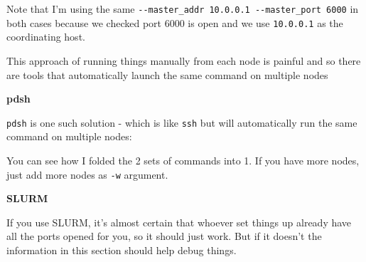 \documentclass[
]{report}
\newenvironment{Shaded}{\begin{snugshade}}{\end{snugshade}}
\newcommand{\AttributeTok}[1]{\textcolor[rgb]{0.40,0.45,0.13}{#1}}
\newcommand{\DataTypeTok}[1]{\textcolor[rgb]{0.68,0.00,0.00}{#1}}
\newcommand{\ExtensionTok}[1]{\textcolor[rgb]{0.00,0.23,0.31}{#1}}
\newcommand{\FunctionTok}[1]{\textcolor[rgb]{0.28,0.35,0.67}{#1}}
\newcommand{\NormalTok}[1]{\textcolor[rgb]{0.00,0.23,0.31}{#1}}
\newcommand{\OperatorTok}[1]{\textcolor[rgb]{0.37,0.37,0.37}{#1}}
\newcommand{\StringTok}[1]{\textcolor[rgb]{0.13,0.47,0.30}{#1}}
\newcommand{\VariableTok}[1]{\textcolor[rgb]{0.07,0.07,0.07}{#1}}
\begin{document}
\begin{Shaded}
\end{Shaded}

Note that I'm using the same
\texttt{-\/-master\_addr\ 10.0.0.1\ -\/-master\_port\ 6000} in both
cases because we checked port 6000 is open and we use \texttt{10.0.0.1}
as the coordinating host.

This approach of running things manually from each node is painful and
so there are tools that automatically launch the same command on
multiple nodes

\textbf{pdsh}

\texttt{pdsh} is one such solution - which is like \texttt{ssh} but will
automatically run the same command on multiple nodes:

\begin{Shaded}
\end{Shaded}

You can see how I folded the 2 sets of commands into 1. If you have more
nodes, just add more nodes as \texttt{-w} argument.

\textbf{SLURM}

If you use SLURM, it's almost certain that whoever set things up already
have all the ports opened for you, so it should just work. But if it
doesn't the information in this section should help debug things.
\end{document}
